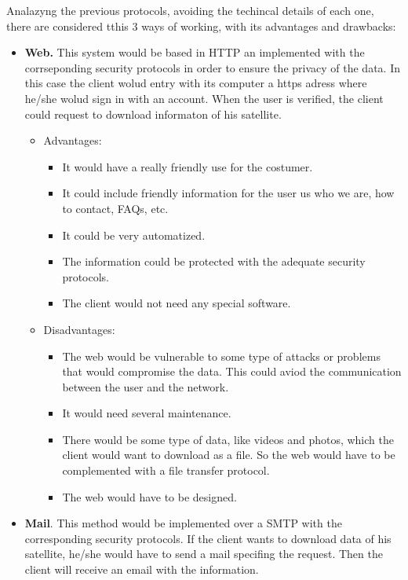 Analazyng the previous protocols, avoiding the techincal details of each one, there are considered tthis 3 ways of working, with its advantages and drawbacks:
\begin{itemize}
\item \textbf{Web.} This system would be based in HTTP an implemented with the corrseponding security protocols in order to ensure the privacy of the data. In this case the client wolud entry with its computer a https adress where he/she wolud sign in with an account. When the user is verified, the client could request to download informaton of his satellite.

\begin{itemize}
\item Advantages: 
\begin{itemize}
\item It would have a really friendly use for the costumer.
\item It could include friendly information for the user us who we are, how to contact, FAQs, etc.
\item It could be very automatized.
\item The information could be protected with the adequate security protocols.
\item The client would not need any special software.
\end{itemize}
\item Disadvantages:
\begin{itemize}
\item The web would be vulnerable to some type of attacks or problems that would compromise the data. This could aviod the communication between the user and the network.
\item It would need several maintenance.
\item There would be some type of data, like videos and photos, which the client would want to download as a file. So the web would have to be complemented with a file transfer protocol.
\item The web would have to be designed.
\end{itemize}
\end{itemize}
\item \textbf{Mail}. This method would be implemented over a SMTP with the corresponding security protocols. If the client wants to download data of his satellite, he/she would have to send a mail specifing the request. Then the client will receive an email with the information.
\begin{itemize}

\end{itemize}
\end{itemize}

